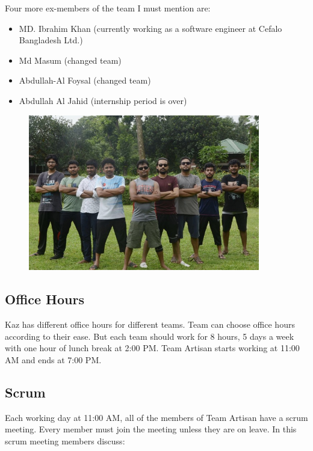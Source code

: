 Four more ex-members of the team I must mention are:

\begin{itemize}
    \item MD. Ibrahim Khan (currently working as a software engineer at Cefalo Bangladesh Ltd.)
    \item Md Masum (changed team)
    \item Abdullah-Al Foysal (changed team)
    \item Abdullah Al Jahid (internship period is over)
\end{itemize}

\begin{figure}[h]
    \begin{center}
        \includegraphics[width=0.9\textwidth]{images/Chapter3/artisan.jpeg}
        \label{fig:team_artisan}
    \end{center}
\end{figure}

\subsection{Office Hours}

Kaz has different office hours for different teams.
Team can choose office hours according to their ease.
But each team should work for 8 hours, 5 days a week with one hour of lunch break at 2:00 PM.
Team Artisan starts working at 11:00 AM and ends at 7:00 PM.

\subsection{Scrum}

Each working day at 11:00 AM, all of the members of Team Artisan have a scrum meeting.
Every member must join the meeting unless they are on leave.
In this scrum meeting members discuss:

